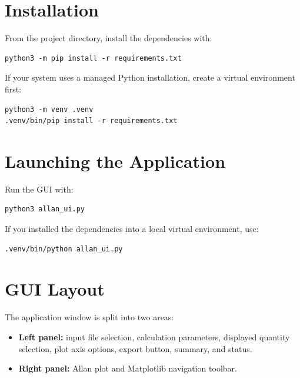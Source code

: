 \documentclass[11pt,a4paper]{article}
\begin{document}
\section{Installation}
From the project directory, install the dependencies with:
\begin{verbatim}
python3 -m pip install -r requirements.txt
\end{verbatim}

If your system uses a managed Python installation, create a virtual environment first:
\begin{verbatim}
python3 -m venv .venv
.venv/bin/pip install -r requirements.txt
\end{verbatim}

\section{Launching the Application}
Run the GUI with:
\begin{verbatim}
python3 allan_ui.py
\end{verbatim}

If you installed the dependencies into a local virtual environment, use:
\begin{verbatim}
.venv/bin/python allan_ui.py
\end{verbatim}

\section{GUI Layout}
The application window is split into two areas:
\begin{itemize}[leftmargin=1.5em]
    \item \textbf{Left panel:} input file selection, calculation parameters, displayed quantity selection, plot axis options, export button, summary, and status.
    \item \textbf{Right panel:} Allan plot and Matplotlib navigation toolbar.
\end{itemize}
\end{document}

